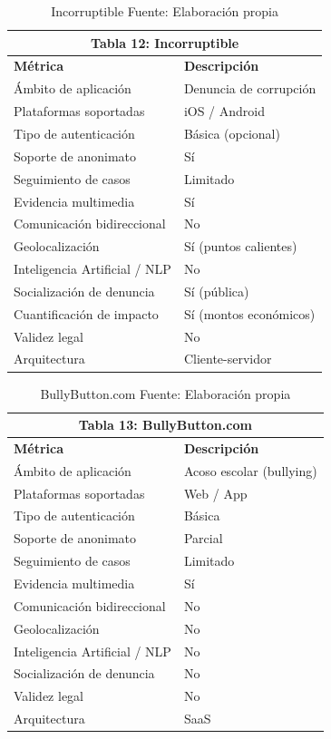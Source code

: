 \begin{table}[htbp]
\centering
\small
\begin{tabular}{|l|l|}
\hline \multicolumn{2}{|c|}{\textbf{Tabla 12: Incorruptible}} \\
\hline \textbf{Métrica} & \textbf{Descripción} \\
\hline Ámbito de aplicación & Denuncia de corrupción \\
\hline Plataformas soportadas & iOS / Android \\
\hline Tipo de autenticación & Básica (opcional) \\
\hline Soporte de anonimato & Sí \\
\hline Seguimiento de casos & Limitado \\
\hline Evidencia multimedia & Sí \\
\hline Comunicación bidireccional & No \\
\hline Geolocalización & Sí (puntos calientes) \\
\hline Inteligencia Artificial / NLP & No \\
\hline Socialización de denuncia & Sí (pública) \\
\hline Cuantificación de impacto & Sí (montos económicos) \\
\hline Validez legal & No \\
\hline Arquitectura & Cliente-servidor \\
\hline \end{tabular}
\caption{Incorruptible \label{tab:incorruptible} \footnotesize Fuente: Elaboración propia \cite{13}} 
\end{table}


\begin{table}[htbp]
\centering
\small
\begin{tabular}{|l|l|}
\hline \multicolumn{2}{|c|}{\textbf{Tabla 13: BullyButton.com}} \\
\hline \textbf{Métrica} & \textbf{Descripción} \\
\hline Ámbito de aplicación & Acoso escolar (bullying) \\
\hline Plataformas soportadas & Web / App \\
\hline Tipo de autenticación & Básica \\
\hline Soporte de anonimato & Parcial \\
\hline Seguimiento de casos & Limitado \\
\hline Evidencia multimedia & Sí \\
\hline Comunicación bidireccional & No \\
\hline Geolocalización & No \\
\hline Inteligencia Artificial / NLP & No \\
\hline Socialización de denuncia & No \\
\hline Validez legal & No \\
\hline Arquitectura & SaaS \\
\hline \end{tabular}
\caption{BullyButton.com \label{tab:bullybutton} \footnotesize Fuente: Elaboración propia \cite{21}} 
\end{table}


